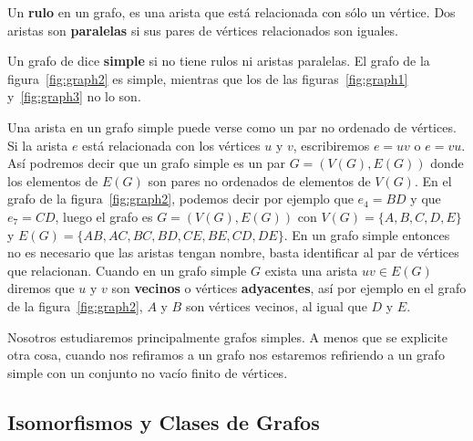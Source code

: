 \begin{definicion}
Un {\bf rulo} en un grafo, es una arista que está relacionada con sólo un vértice.
Dos aristas son {\bf paralelas} si sus pares de vértices relacionados son iguales.

Un grafo de dice {\bf simple} si no tiene rulos ni aristas paralelas.
El grafo de la figura~\ref{fig:graph2} es simple, mientras que los de las figuras~\ref{fig:graph1} y~\ref{fig:graph3} no lo son.

Una arista en un grafo simple puede verse como un par no ordenado de vértices.
Si la arista $e$ está relacionada con los vértices $u$ y $v$, escribiremos $e=uv$ o $e=vu$.
Así podremos decir que un grafo simple es un par $G=(V(G),E(G))$ donde los elementos de $E(G)$ son pares no ordenados de elementos de $V(G)$. 
En el grafo de la figura~\ref{fig:graph2}, podemos decir por ejemplo que $e_4=BD$ y que $e_7=CD$, luego el grafo es $G=(V(G),E(G))$ con $V(G)=\{A,B,C,D,E\}$ y $E(G)=\{AB,AC,BC,BD,CE,BE,CD,DE\}$.
En un grafo simple entonces no es necesario que las aristas tengan nombre, basta identificar al par de vértices que relacionan.
Cuando en un grafo simple $G$ exista una arista $uv\in E(G)$ diremos que $u$ y $v$ son {\bf vecinos} o vértices {\bf adyacentes}, así por ejemplo en el grafo de la figura~\ref{fig:graph2}, $A$ y $B$ son vértices vecinos, al igual que $D$ y $E$.
%

Nosotros estudiaremos principalmente grafos simples.
A menos que se explicite otra cosa, cuando nos refiramos a un grafo nos estaremos refiriendo a un grafo simple con un conjunto no vacío finito de vértices.
\end{definicion}

\subsection{Isomorfismos y Clases de Grafos}

